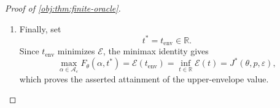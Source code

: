 \begin{proof}[Proof of \cref{obj:thm:finite-oracle}]
\begin{enumerate}
For \(S\in\mathcal S\), define
\[
r_S=\sum_{j=0}^3b_S(x_j)>0.
\]
The dominating measure and conditional densities of this channel
satisfy
\[
\nu_{Q_{\alpha_{\mathrm{opt}}}}(\{S\})
=(\alpha_{\mathrm{opt}})_Sr_S,
\qquad
d_{Q_{\alpha_{\mathrm{opt}}},j}(S)
=
\begin{cases}
b_S(x_j)/r_S,&(\alpha_{\mathrm{opt}})_S>0,\\
0,&(\alpha_{\mathrm{opt}})_S=0.
\end{cases}
\]
The zero-weight outputs have zero dominating mass. At every
positive-weight output, the output density and its derivative are
\[
f_{\theta,Q_{\alpha_{\mathrm{opt}}}}(S)
=\frac{h_S(\theta)}{r_S},
\qquad
\dot f_{\theta,Q_{\alpha_{\mathrm{opt}}}}(S)
=\frac{g_S}{r_S}.
\]
Hence integration over the finite alphabet gives
\[
\begin{aligned}
I_\theta(Q_{\alpha_{\mathrm{opt}}})
&=
\sum_{\substack{S\in\mathcal S\\(\alpha_{\mathrm{opt}})_S>0}}
(\alpha_{\mathrm{opt}})_Sr_S
\frac{g_Sg_S^\top}{h_S(\theta)r_S}\\
&=
\sum_{S\in\mathcal S}
(\alpha_{\mathrm{opt}})_S
\frac{g_Sg_S^\top}{h_S(\theta)}
=
I_\theta(\alpha_{\mathrm{opt}}).
\end{aligned}
\]
Together with the preceding variance calculation, this proves
\[
c^\top I_\theta(Q_{\alpha_{\mathrm{opt}}})^+c
=
c^\top I_\theta(\alpha_{\mathrm{opt}})^+c
=
V^*(\theta,p,\varepsilon).
\]
The universal lower bound and this admissible attaining channel
then yield
\[
\inf_Qc^\top I_\theta(Q)^+c=V^*(\theta,p,\varepsilon),
\]
with the infimum taken over the channel class in the statement.

\item Finally, set
\[
t^*=t_{\mathrm{env}}\in\mathbb R.
\]
Since \(t_{\mathrm{env}}\) minimizes \(\mathscr E\), the minimax identity
gives
\[
\max_{\alpha\in\mathcal A_\varepsilon}
F_\theta(\alpha,t^*)
=
\mathscr E(t_{\mathrm{env}})
=
\inf_{t\in\mathbb R}\mathscr E(t)
=
J^*(\theta,p,\varepsilon),
\]
which proves the asserted attainment of the upper-envelope value.
\end{enumerate}
\end{proof}

